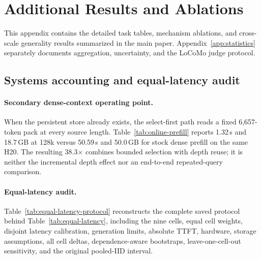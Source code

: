 \section{Additional Results and Ablations}
\label{sec:appendix}

This appendix contains the detailed task tables, mechanism ablations, and
cross-scale generality results summarized in the main paper.
Appendix~\ref{app:statistics} separately documents aggregation, uncertainty,
and the LoCoMo judge protocol.

\subsection{Systems accounting and equal-latency audit}
\label{app:systems}

\paragraph{Secondary dense-context operating point.}
When the persistent store already exists, the select-first path reads a fixed
6,657-token pack at every source length. Table~\ref{tab:online-prefill} reports
1.32\,s and 18.7\,GB at 128k versus 50.59\,s and 50.0\,GB for stock dense
prefill on the same H20. The resulting 38.3$\times$ combines bounded selection
with depth reuse; it is neither the incremental depth effect nor an end-to-end
repeated-query comparison.





\paragraph{Equal-latency audit.}


Table~\ref{tab:equal-latency-protocol} reconstructs the complete saved protocol
behind Table~\ref{tab:equal-latency}, including the nine cells, equal cell
weights, disjoint latency calibration, generation limits, absolute TTFT,
hardware, storage assumptions, all cell deltas, dependence-aware bootstraps,
leave-one-cell-out sensitivity, and the original pooled-IID interval.



